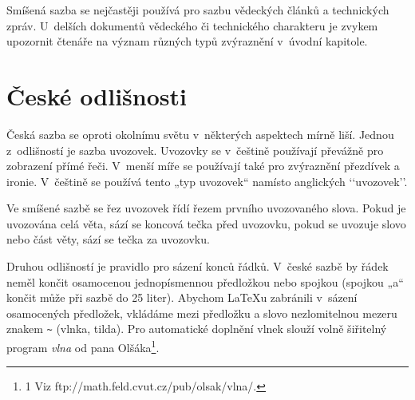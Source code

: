 \documentclass [11pt,a4paper,twocolumn]{article}
\providecommand{\uv}[1]{„#1“}
\begin{document}
Smíšená sazba se nejčastěji používá pro sazbu vědeckých článků a technických zpráv. U~delších dokumentů vědeckého či technického charakteru je zvykem upozornit čtenáře na význam různých typů zvýraznění v~úvodní kapitole.

\section{České odlišnosti}

Česká sazba se oproti okolnímu světu v~některých aspektech mírně liší. Jednou z~odlišností je sazba u\-vo\-zo\-vek. Uvozovky se v~češtině používají převážně pro zobrazení přímé řeči. V~menší míře se používají také pro zvýraznění přezdívek a ironie. V~češtině se používá tento \uv{typ u\-vo\-zo\-vek} namísto anglických ‘‘uvozovek’’.

Ve smíšené sazbě se řez uvozovek řídí řezem prvního uvozovaného slova. Pokud je uvozována celá věta, sází se koncová tečka před uvozovku, pokud se uvozuje slovo nebo část věty, sází se tečka za uvozovku.

Druhou odlišností je pravidlo pro sázení konců řádků. V~české sazbě by řádek neměl končit osamocenou jednopísmennou předložkou nebo spojkou (spojkou \uv{a} končit může při sazbě do 25 liter). Abychom \LaTeX u zabránili v~sázení osamocených předložek, vkládáme mezi předložku a slovo nezlomitelnou mezeru znakem \texttt{\~{}} (vlnka, tilda). Pro automatické doplnění vlnek slouží volně šiřitelný program \emph{vlna} od pana Olšáka\footnote{1 Viz ftp://math.feld.cvut.cz/pub/olsak/vlna/.}.
\end{document}
